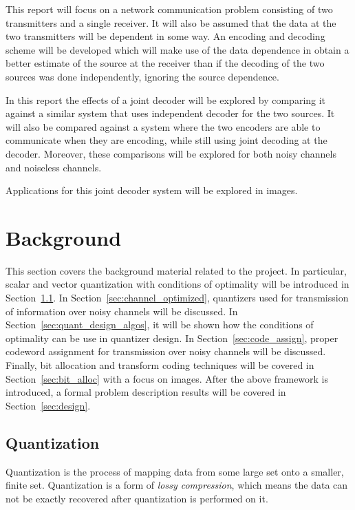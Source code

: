 \documentclass[10pt]{article}
\begin{document}
This report will focus on a network communication problem consisting of two transmitters and a single receiver. It will also be assumed that the data at the two transmitters will be dependent in some way. An encoding and decoding scheme will be developed which will make use of the data dependence in obtain a better estimate of the source at the receiver than if the decoding of the two sources was done independently, ignoring the source dependence.

In this report the effects of a joint decoder will be explored by comparing it against a similar system that uses independent decoder for the two sources. It will also be compared against a system where the two encoders are able to communicate when they are encoding, while still using joint decoding at the decoder. Moreover, these comparisons will be explored for both noisy channels and noiseless channels.

Applications for this joint decoder system will be explored in images.

\section{Background}
This section covers the background material related to the project. In particular, scalar and vector quantization with conditions of optimality will be introduced in Section~\ref{sec:quantization}. In Section~\ref{sec:channel_optimized}, quantizers used for transmission of information over noisy channels will be discussed. In Section~\ref{sec:quant_design_algos}, it will be shown how the conditions of optimality can be use in quantizer design. In Section~\ref{sec:code_assign}, proper codeword assignment for transmission over noisy channels will be discussed. Finally, bit allocation and transform coding techniques will be covered in Section~\ref{sec:bit_alloc} with a focus on images. After the above framework is introduced, a formal problem description results will be covered in Section~\ref{sec:design}.

\subsection{Quantization}
\label{sec:quantization}
Quantization is the process of mapping data from some large set onto a smaller, finite set. Quantization is a form of \emph{lossy compression}, which means the data can not be exactly recovered after quantization is performed on it.
\end{document}
